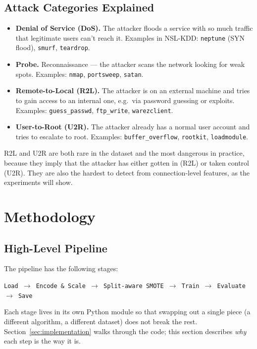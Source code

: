 \documentclass[11pt, a4paper]{article}
\begin{document}
\subsection{Attack Categories Explained}
\begin{itemize}
    \item \textbf{Denial of Service (DoS).} The attacker floods a service with so much traffic that legitimate users can't reach it. Examples in NSL-KDD: \texttt{neptune} (SYN flood), \texttt{smurf}, \texttt{teardrop}.
    \item \textbf{Probe.} Reconnaissance --- the attacker scans the network looking for weak spots. Examples: \texttt{nmap}, \texttt{portsweep}, \texttt{satan}.
    \item \textbf{Remote-to-Local (R2L).} The attacker is on an external machine and tries to gain access to an internal one, e.g.\ via password guessing or exploits. Examples: \texttt{guess\_passwd}, \texttt{ftp\_write}, \texttt{warezclient}.
    \item \textbf{User-to-Root (U2R).} The attacker already has a normal user account and tries to escalate to root. Examples: \texttt{buffer\_overflow}, \texttt{rootkit}, \texttt{loadmodule}.
\end{itemize}

R2L and U2R are both rare in the dataset and the most dangerous in practice, because they imply that the attacker has either gotten in (R2L) or taken control (U2R). They are also the hardest to detect from connection-level features, as the experiments will show.

\section{Methodology}
\label{sec:methodology}

\subsection{High-Level Pipeline}
The pipeline has the following stages:

\begin{center}
\texttt{Load $\to$ Encode \& Scale $\to$ Split-aware SMOTE $\to$ Train $\to$ Evaluate $\to$ Save}
\end{center}

Each stage lives in its own Python module so that swapping out a single piece (a different algorithm, a different dataset) does not break the rest. Section~\ref{sec:implementation} walks through the code; this section describes \emph{why} each step is the way it is.
\end{document}
